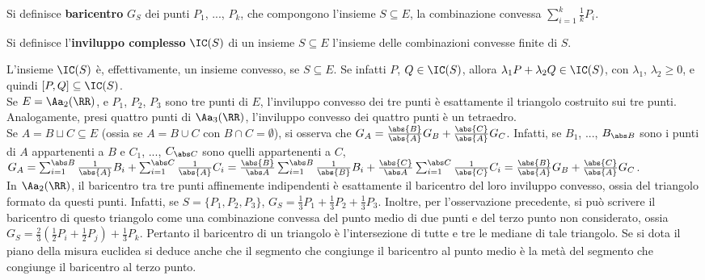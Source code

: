 \documentclass[11pt]{article}
\begin{document}
	\begin{definition} [baricentro]
		Si definisce \textbf{baricentro} $G_S$ dei punti $P_1$, ..., $P_k$,
		che compongono l'insieme $S \subseteq E$, la combinazione convessa
		$\sum_{i=1}^k \frac{1}{k} P_i$.
	\end{definition}

	\begin{definition}  Si definisce l'\textbf{inviluppo complesso} $\IC(S)$ di un insieme
		$S \subseteq E$ l'insieme delle combinazioni convesse finite di $S$.
	\end{definition}

	\begin{remark}\nl
		\li L'insieme $\IC(S)$ è, effettivamente, un insieme convesso, se $S \subseteq E$. Se infatti $P$, $Q \in \IC(S)$,
		allora $\lambda_1 P + \lambda_2 Q \in \IC(S)$, con $\lambda_1$, $\lambda_2 \geq 0$, e quindi
		$[P, Q] \subseteq \IC(S)$. \\
		\li Se $E = \Aa_2(\RR)$, e $P_1$, $P_2$, $P_3$ sono tre punti di $E$, l'inviluppo convesso dei
		tre punti è esattamente il triangolo costruito sui tre punti. Analogamente, presi quattro
		punti di $\Aa_3(\RR)$, l'inviluppo convesso dei quattro punti è un tetraedro. \\
		\li Se $A = B \sqcup C \subseteq E$ (ossia se $A = B \cup C$ con
		$B \cap C = \emptyset$), si osserva che $G_A = \frac{\abs{B}}{\abs{A}} G_B + \frac{\abs{C}}{\abs{A}} G_C$. Infatti, se $B_1$, ..., $B_{\abs B}$ sono i punti di $A$ appartenenti a $B$ e $C_1$, ..., $C_{\abs C}$ sono
		quelli appartenenti a $C$, $G_A = \sum_{i=1}^{\abs B} \frac{1}{\abs{A}} B_i + \sum_{i=1}^{\abs C} \frac{1}{\abs{A}} C_i = \frac{\abs{B}}{\abs A} \sum_{i=1}^{\abs B} \frac{1}{\abs{B}} B_i + \frac{\abs{C}}{\abs A} \sum_{i=1}^{\abs C} \frac{1}{\abs{C}} C_i = \frac{\abs{B}}{\abs{A}} G_B + \frac{\abs{C}}{\abs{A}} G_C$. \\
		\li In $\Aa_2(\RR)$, il baricentro tra tre punti affinemente
		indipendenti è esattamente il baricentro del loro inviluppo
		convesso, ossia del triangolo formato da questi punti. Infatti,
		se $S = \{ P_1, P_2, P_3 \}$, $G_S = \frac{1}{3} P_1 + \frac{1}{3} P_2 +
		\frac{1}{3} P_3$. Inoltre, per l'osservazione precedente, si può
		scrivere il baricentro di questo triangolo come una combinazione
		convessa del punto medio di due punti e del terzo punto non
		considerato, ossia $G_S = \frac{2}{3} \left( \frac{1}{2} P_i + \frac{1}{2} P_j \right) + \frac{1}{3} P_k$. Pertanto il baricentro
		di un triangolo è l'intersezione di tutte e tre le mediane di
		tale triangolo. Se si dota il piano della misura euclidea si deduce
		anche che il segmento che congiunge il baricentro al
		punto medio è la metà del segmento che congiunge il baricentro
		al terzo punto.
	\end{remark}
	
\end{document}
